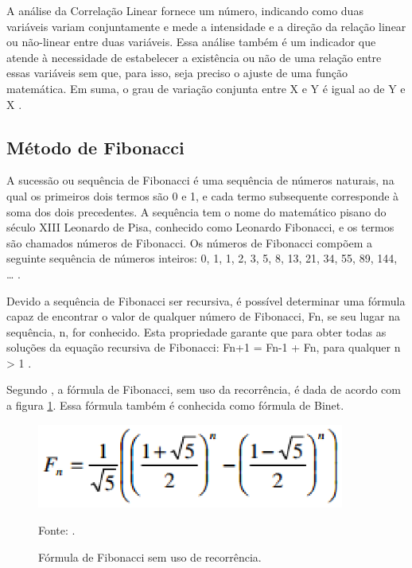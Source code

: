 A análise da Correlação Linear fornece um número, indicando como duas variáveis variam conjuntamente e mede a intensidade e a direção da relação linear ou não-linear entre duas variáveis. Essa análise também é um indicador que atende à necessidade de estabelecer a existência ou não de uma relação entre essas variáveis sem que, para isso, seja preciso o ajuste de uma função matemática. Em suma, o grau de variação conjunta entre X e Y é igual ao de Y e X \cite[pág.~65]{lira2004}.

\subsection{Método de Fibonacci}

A sucessão ou sequência de Fibonacci é uma sequência de números naturais, na qual os primeiros dois termos são 0 e 1, e cada termo subsequente corresponde à soma dos dois precedentes. A sequência tem o nome do matemático pisano do século XIII Leonardo de Pisa,  conhecido como Leonardo Fibonacci, e os termos são chamados números de Fibonacci. Os números de Fibonacci compõem a seguinte sequência de números inteiros: 0, 1, 1, 2, 3, 5, 8, 13, 21, 34, 55, 89, 144, … \cite[pág.~6]{gagliardi2013}.

Devido a sequência de Fibonacci ser recursiva, é possível determinar uma fórmula capaz de encontrar o valor de qualquer número de Fibonacci, Fn, se seu lugar na sequência, n, for conhecido. Esta propriedade garante que para obter todas as soluções da equação recursiva de Fibonacci: Fn+1 = Fn-1 + Fn, para qualquer n > 1 \cite[pág.~12]{sousa2012}.

Segundo , a fórmula de Fibonacci, sem uso da recorrência, é dada de acordo com a figura \ref{formulaFibonacci}. Essa fórmula também é conhecida como fórmula de Binet.

\begin{figure}[htp]
\centering
\includegraphics[width=0.9\textwidth]{figuras/formulaFibonacci}
\caption{Fórmula de Fibonacci sem uso de recorrência.}{Fonte: .} 
\label{formulaFibonacci}
\end{figure}

